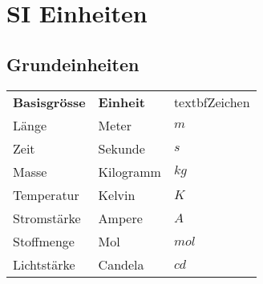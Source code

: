 



\section{SI Einheiten}
\subsection{Grundeinheiten}
\begin{tabular}{lll}
  \rowcolor{white} \textbf{Basisgrösse} & \textbf{Einheit} & textbf{Zeichen}\\
  \rowcolor{lgray} Länge                & Meter            & $m$\\
  \rowcolor{white} Zeit                 & Sekunde          & $s$\\
  \rowcolor{lgray} Masse                & Kilogramm        & $kg$\\
  \rowcolor{white} Temperatur           & Kelvin           & $K$\\
  \rowcolor{lgray} Stromstärke          & Ampere           & $A$\\
  \rowcolor{white} Stoffmenge           & Mol              & $mol$\\
  \rowcolor{lgray} Lichtstärke          & Candela          & $cd$\\
\end{tabular}

